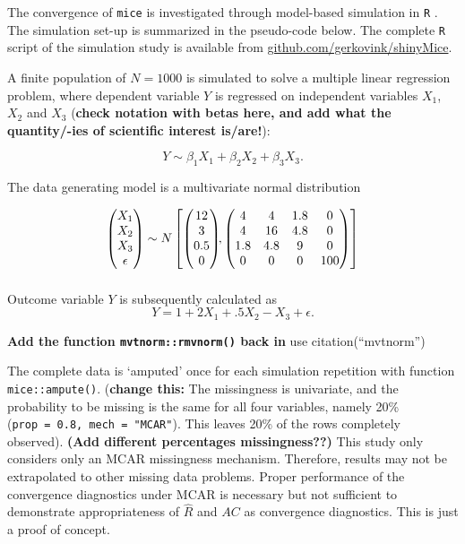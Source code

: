 \documentclass[Royal,times,sageh]{sagej}
\begin{document}
The convergence of \texttt{mice} is investigated through model-based
simulation in \texttt{R} \citep[version 3.6.3;][]{R}. The simulation
set-up is summarized in the pseudo-code below. The complete \texttt{R}
script of the simulation study is available from
\href{https://github.com/gerkovink/shinyMice/tree/master/3.Thesis/1.SimulationStudy}{github.com/gerkovink/shinyMice}.

A finite population of \(N=1000\) is simulated to solve a multiple
linear regression problem, where dependent variable \(Y\) is regressed
on independent variables \(X_1\), \(X_2\) and \(X_3\) (\textbf{check
notation with betas here, and add what the quantity/-ies of scientific
interest is/are!}):

\[Y \sim \beta_1 X_1 + \beta_2 X_2 + \beta_3 X_3.\]

The data generating model is a multivariate normal distribution

\begin{align*}
\begin{pmatrix}X_1\\
X_2\\
X_3\\
\epsilon
\end{pmatrix} \sim  N
\begin{bmatrix}
\begin{pmatrix}
12\\
3\\
0.5\\
0
\end{pmatrix}\!\!,
\begin{pmatrix}
4 & 4 & 1.8 & 0\\
4 & 16 & 4.8 & 0\\
1.8 & 4.8 & 9 & 0\\
0 & 0 & 0 & 100
\end{pmatrix}
\end{bmatrix}\\[2\jot]
\end{align*}

Outcome variable \(Y\) is subsequently calculated as
\[Y =  1 + 2X_1 + .5X_2 - X_3 + \epsilon .\]

\textbf{Add the function \texttt{mvtnorm::rmvnorm()} back in} use
citation(``mvtnorm'')

The complete data is `amputed' once for each simulation repetition with
function \texttt{mice::ampute()}. (\textbf{change this:} The missingness
is univariate, and the probability to be missing is the same for all
four variables, namely 20\% (\texttt{prop\ =\ 0.8,\ mech\ =\ "MCAR"}).
This leaves 20\% of the rows completely observed). \textbf{(Add
different percentages missingness??)} This study only considers only an
MCAR missingness mechanism. Therefore, results may not be extrapolated
to other missing data problems. Proper performance of the convergence
diagnostics under MCAR is necessary but not sufficient to demonstrate
appropriateness of \(\widehat{R}\) and \(AC\) as convergence
diagnostics. This is just a proof of concept.
\end{document}
